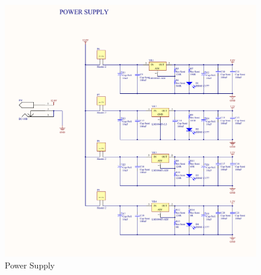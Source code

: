 \begin{figure}[h]
  \centering
  \includegraphics[width=\textwidth]{fig/pcb/schematics/pcbschematic_powersupply.pdf}
  \caption{Power Supply}
  \label{fig:schematic-pcb-powersupply}
\end{figure}
